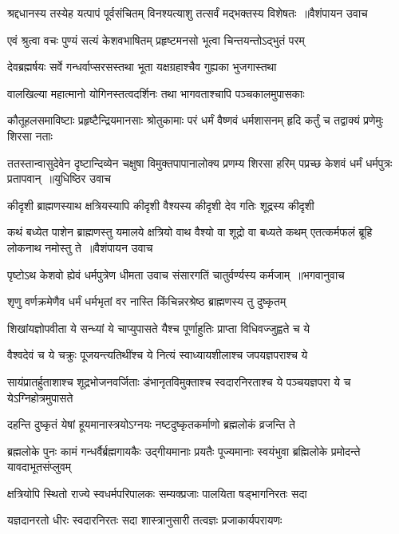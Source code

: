 \threelineshloka
{श्रद्दधानस्य तस्येह यत्पापं पूर्वसंचितम्}
{विनश्यत्याशु तत्सर्वं मद्भक्तस्य विशेषतः ॥वैशंपायन उवाच}
{}


\twolineshloka
{एवं श्रुत्वा वचः पुण्यं सत्यं केशवभाषितम्}
{प्रहृष्टमनसो भूत्वा चिन्तयन्तोऽद्भुतं परम्}


\twolineshloka
{देवब्रह्मर्षयः सर्वे गन्धर्वाप्सरसस्तथा}
{भूता यक्षग्रहाश्चैव गुह्यका भुजगास्तथा}


\twolineshloka
{वालखिल्या महात्मानो योगिनस्तत्वदर्शिनः}
{तथा भागवताश्चापि पञ्चकालमुपासकाः}


\threelineshloka
{कौतूहलसमाविष्टाः प्रहृष्टैन्द्रियमानसाः}
{श्रोतुकामाः परं धर्मं वैष्णवं धर्मशासनम्}
{हृदि कर्तुं च तद्वाक्यं प्रणेमुः शिरसा नताः}


\fourlineindentedshloka
{ततस्तान्वासुदेवेन दृष्टान्दिव्येन चक्षुषा}
{विमुक्तपापानालोक्य प्रणम्य शिरसा हरिम्}
{पप्रच्छ केशवं धर्मं धर्मपुत्रः प्रतापवान् ॥युधिष्ठिर उवाच}
{}


\twolineshloka
{कीदृशी ब्राह्मणस्याथ क्षत्रियस्यापि कीदृशी}
{वैश्यस्य कीदृशी देव गतिः शूद्रस्य कीदृशी}


\fourlineindentedshloka
{कथं बध्येत पाशेन ब्राह्मणस्तु यमालये}
{क्षत्रियो वाथ वैश्यो वा शूद्रो वा बध्यते कथम्}
{एतत्कर्मफलं ब्रूहि लोकनाथ नमोस्तु ते ॥वैशंपायन उवाच}
{}


\threelineshloka
{पृष्टोऽथ केशवो ह्येवं धर्मपुत्रेण धीमता}
{उवाच संसारगतिं चातुर्वर्ण्यस्य कर्मजाम् ॥भगवानुवाच}
{}


\twolineshloka
{शृणु वर्णक्रमेणैव धर्मं धर्मभृतां वर}
{नास्ति किंचिन्नरश्रेष्ठ ब्राह्मणस्य तु दुष्कृतम्}


\twolineshloka
{शिखांयज्ञोपवीता ये सन्ध्यां ये चाप्युपासते}
{यैश्च पूर्णाहुतिः प्राप्ता विधिवज्जुह्वते च ये}


\twolineshloka
{वैश्वदेवं च ये चक्रुः पूजयन्त्यतिथींश्च ये}
{नित्यं स्वाध्यायशीलाश्च जपयज्ञपराश्च ये}


\threelineshloka
{सायंप्रातर्हुताशाश्च शूद्रभोजनवर्जिताः}
{डंभानृतविमुक्ताश्च स्वदारनिरताश्च ये}
{पञ्चयज्ञपरा ये च येऽग्निहोत्रमुपासते}


\twolineshloka
{दहन्ति दुष्कृतं येषां हूयमानास्त्रयोऽग्नयः}
{नष्टदुष्कृतकर्माणो ब्रह्मलोकं व्रजन्ति ते}


\threelineshloka
{ब्रह्मलोके पुनः कामं गन्धर्वैर्ब्रह्मगायकैः}
{उद्गीयमानाः प्रयतैः पूज्यमानाः स्वयंभुवा}
{ब्रह्मिलोके प्रमोदन्ते यावदाभूतसंप्लुवम्}


\twolineshloka
{क्षत्रियोपि स्थितो राज्ये स्वधर्मपरिपालकः}
{सम्यक्प्रजाः पालयिता षड्भागनिरतः सदा}


\twolineshloka
{यज्ञदानरतो धीरः स्वदारनिरतः सदा}
{शास्त्रानुसारी तत्वज्ञः प्रजाकार्यपरायणः}


